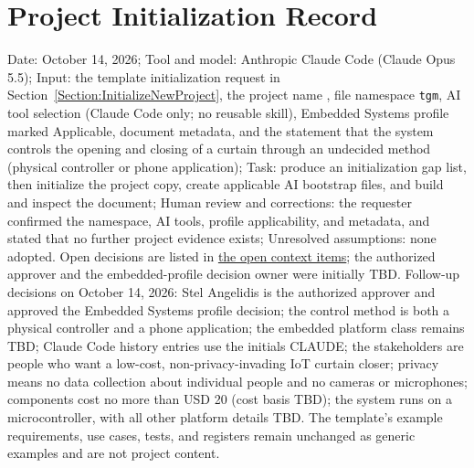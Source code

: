 \section{Project Initialization Record}
\label{Section:PromptLogInitialization}
Date: October 14, 2026; Tool and model: Anthropic Claude Code (Claude Opus
5.5); Input: the template initialization request in
Section~\ref{Section:InitializeNewProject}, the project name
\ProjectName, file namespace \texttt{tgm}, AI tool selection (Claude Code
only; no reusable skill), Embedded Systems profile marked Applicable, document
metadata, and the statement that the system controls the opening and closing
of a curtain through an undecided method (physical controller or phone
application); Task: produce an initialization gap list, then initialize the
project copy, create applicable AI bootstrap files, and build and inspect the
document; Human review and corrections: the requester confirmed the namespace,
AI tools, profile applicability, and metadata, and stated that no further
project evidence exists; Unresolved assumptions: none adopted. Open decisions
are listed in \hyperref[Section:OpenContextItems]{the open context items}; the
authorized approver and the embedded-profile decision owner were initially
TBD. Follow-up decisions on October 14, 2026: Stel Angelidis is the authorized
approver and approved the Embedded Systems profile decision; the control
method is both a physical controller and a phone application; the embedded
platform class remains TBD; Claude Code history entries use the initials
CLAUDE; the stakeholders are people who want a low-cost, non-privacy-invading
IoT curtain closer; privacy means no data collection about individual people
and no cameras or microphones; components cost no more than USD 20 (cost basis
TBD); the system runs on a microcontroller, with all other platform details
TBD. The
template's example requirements, use cases, tests, and registers remain
unchanged as generic examples and are not project content.
